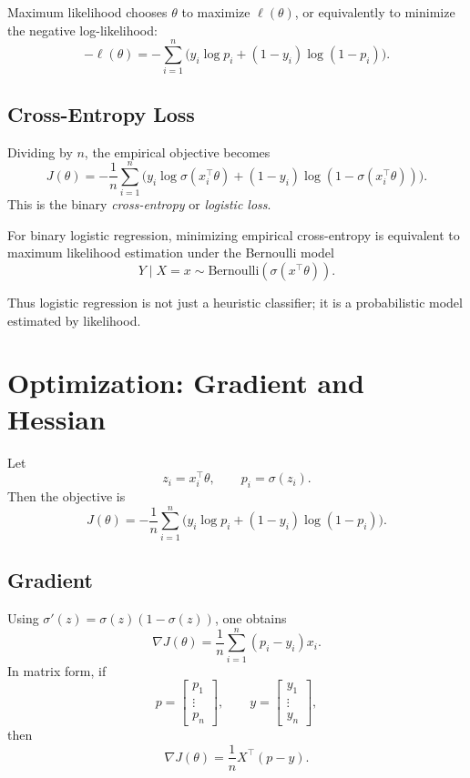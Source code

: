 Maximum likelihood chooses $\theta$ to maximize $\ell(\theta)$, or equivalently to minimize the negative log-likelihood:
\[
-\ell(\theta)
=
-\sum_{i=1}^n \Big(y_i\log p_i+(1-y_i)\log(1-p_i)\Big).
\]

\subsection{Cross-Entropy Loss}

Dividing by $n$, the empirical objective becomes
\[
J(\theta)=
-\frac1n\sum_{i=1}^n
\Big(
y_i\log \sigma(x_i^\top\theta)
+
(1-y_i)\log(1-\sigma(x_i^\top\theta))
\Big).
\]
This is the binary \emph{cross-entropy} or \emph{logistic loss}.

\begin{proposition}
For binary logistic regression, minimizing empirical cross-entropy is equivalent to maximum likelihood estimation under the Bernoulli model
\[
Y\mid X=x \sim \mathrm{Bernoulli}(\sigma(x^\top\theta)).
\]
\end{proposition}

Thus logistic regression is not just a heuristic classifier; it is a probabilistic model estimated by likelihood.

\section{Optimization: Gradient and Hessian}

Let
\[
z_i=x_i^\top\theta,
\qquad
p_i=\sigma(z_i).
\]
Then the objective is
\[
J(\theta)=
-\frac1n\sum_{i=1}^n \big(y_i\log p_i+(1-y_i)\log(1-p_i)\big).
\]

\subsection{Gradient}

Using $\sigma'(z)=\sigma(z)(1-\sigma(z))$, one obtains
\[
\nabla J(\theta)
=
\frac1n\sum_{i=1}^n (p_i-y_i)x_i.
\]
In matrix form, if
\[
p=
\begin{bmatrix}
p_1\\ \vdots\\ p_n
\end{bmatrix},
\qquad
y=
\begin{bmatrix}
y_1\\ \vdots\\ y_n
\end{bmatrix},
\]
then
\[
\nabla J(\theta)=\frac1n X^\top(p-y).
\]

